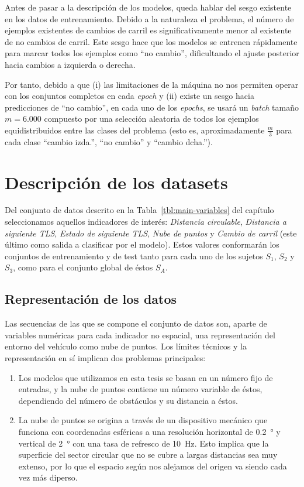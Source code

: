 Antes de pasar a la descripción de los modelos, queda hablar del sesgo existente en los datos de entrenamiento. Debido a la naturaleza el problema, el número de ejemplos existentes de cambios de carril es significativamente menor al existente de no cambios de carril. Este sesgo hace que los modelos se entrenen rápidamente para marcar todos los ejemplos como \enquote{no cambio}, dificultando el ajuste posterior hacia cambios a izquierda o derecha.

Por tanto, debido a que (i) las limitaciones de la máquina no nos permiten operar con los conjuntos completos en cada \textit{epoch} y (ii) existe un sesgo hacia predicciones de \enquote{no cambio}, en cada uno de los \textit{epochs}, se usará un \textit{batch} tamaño $m = 6.000$ compuesto por una selección aleatoria de todos los ejemplos equidistribuidos entre las clases del problema (esto es, aproximadamente $\frac{m}{3}$ para cada clase \enquote{cambio izda.}, \enquote{no cambio} y \enquote{cambio dcha.}).

\section{Descripción de los datasets}

Del conjunto de datos descrito en la Tabla~\ref{tbl:main-variables} del capítulo~ seleccionamos aquellos indicadores de interés: \textit{Distancia circulable}, \textit{Distancia a siguiente TLS}, \textit{Estado de siguiente TLS}, \textit{Nube de puntos} y \textit{Cambio de carril} (este último como salida a clasificar por el modelo). Estos valores conformarán los conjuntos de entrenamiento y de test tanto para cada uno de los sujetos $S_1$, $S_2$ y $S_3$, como para el conjunto global de éstos $S_A$.

\subsection{Representación de los datos}

Las secuencias de las que se compone el conjunto de datos son, aparte de variables numéricas para cada indicador no espacial, una representación del entorno del vehículo como nube de puntos. Los límites técnicos y la representación en sí implican dos problemas principales:

\begin{enumerate}
	\item Los modelos que utilizamos en esta tesis se basan en un número fijo de entradas, y la nube de puntos contiene un número variable de éstos, dependiendo del número de obstáculos y su distancia a éstos.
	\item La nube de puntos se origina a través de un dispositivo mecánico que funciona con coordenadas esféricas a una resolución horizontal de \SI{0.2}{\degree} y vertical de \SI{2}{\degree} con una tasa de refresco de \SI{10}{\hertz}. Esto implica que la superficie del sector circular que no se cubre a largas distancias sea muy extenso, por lo que el espacio según nos alejamos del origen va siendo cada vez más diperso.
\end{enumerate}

